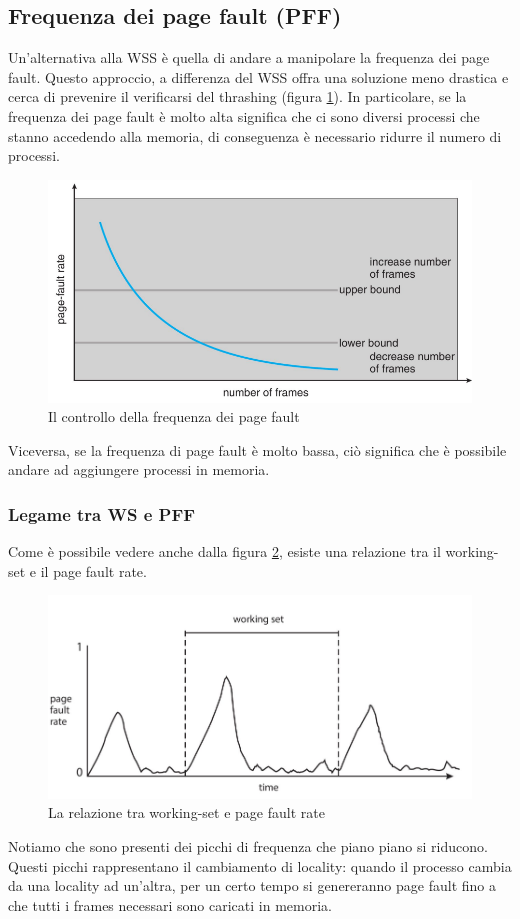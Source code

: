 \subsection{Frequenza dei page fault (PFF)}
Un'alternativa alla WSS è quella di andare a manipolare la frequenza dei page fault. Questo approccio, a differenza del WSS offra una soluzione meno drastica e cerca di prevenire il verificarsi del thrashing (figura \ref{fig:PFF}). In particolare, se la frequenza dei page fault è molto alta significa che ci sono diversi processi che stanno accedendo alla memoria, di conseguenza è necessario ridurre il numero di processi.
\begin{figure}[h]
    \centering
    \includegraphics[width = .5\textwidth]{../res/imgs/virtual memory/PFF.png}
    \caption{Il controllo della frequenza dei page fault}
    \label{fig:PFF}
\end{figure}
Viceversa, se la frequenza di page fault è molto bassa, ciò significa che è possibile andare ad aggiungere processi in memoria.

% 
\subsubsection*{Legame tra WS e PFF}
Come è possibile vedere anche dalla figura \ref{fig:WS_vs_PFF}, esiste una relazione tra il working-set e il page fault rate. 
\begin{figure}[h]
    \centering
    \includegraphics[width = .65\textwidth]{../res/imgs/virtual memory/WS_vs_PFF.png}
    \caption{La relazione tra working-set e page fault rate}
    \label{fig:WS_vs_PFF}
\end{figure}
Notiamo che sono presenti dei picchi di frequenza che piano piano si riducono. Questi picchi rappresentano il cambiamento di locality: quando il processo cambia da una locality ad un'altra, per un certo tempo si genereranno page fault fino a che tutti i frames necessari sono caricati in memoria.

